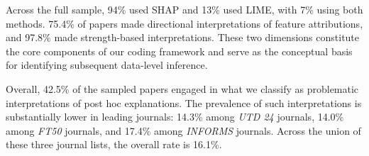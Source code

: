 \documentclass[11pt]{article}
\begin{document}
Across the full sample,   94\% used SHAP and 13\% used LIME, with 7\% using both methods. 75.4\% of papers made directional interpretations of feature attributions, and 97.8\% made strength-based interpretations. These two dimensions constitute the core components of our coding framework and serve as the conceptual basis for identifying subsequent data-level inference.

Overall, 42.5\% of the sampled papers engaged in what we classify as problematic interpretations of post hoc explanations. The prevalence of such interpretations is substantially lower in leading journals: 14.3\% among \textit{UTD 24} journals, 14.0\% among \textit{FT50} journals, and 17.4\% among \textit{INFORMS} journals. Across the union of these three journal lists, the overall rate is 16.1\%.




\end{document}
